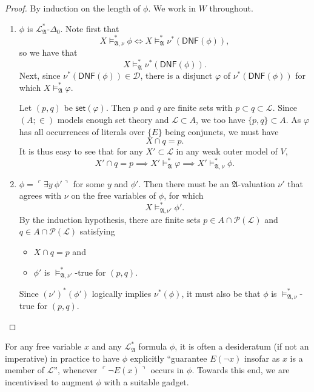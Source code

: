 \documentclass[12pt]{article}
\numberwithin{equation}{section}
\begin{document}
\begin{proof}
By induction on the length of $\phi$. We work in $W$ throughout.
\begin{enumerate}[label=Case \arabic*:, leftmargin=50pt]
    \item $\phi$ is $\mathcal{L}^{*}_{\mathfrak{A}}$-$\Delta_0$. Note first that $$X \models^*_{\mathfrak{A}, \nu} \phi \iff X \models^*_{\mathfrak{A}} \nu^*(\mathsf{DNF}(\phi)),$$ so we have that $$X \models^*_{\mathfrak{A}} \nu^*(\mathsf{DNF}(\phi)).$$ Next, since $\nu^*(\mathsf{DNF}(\phi)) \in \mathcal{D}$, there is a disjunct $\varphi$ of $\nu^*(\mathsf{DNF}(\phi))$ for which $X \models^*_{\mathfrak{A}} \varphi$. 
    
    Let $(p, q)$ be $\mathsf{set}(\varphi)$. Then $p$ and $q$ are finite sets with $p \subset q \subset \mathcal{L}$. Since $(A; \in)$ models enough set theory and $\mathcal{L} \subset A$, we too have $\{p, q\} \subset A$. As $\varphi$ has all occurrences of literals over $\{E\}$ being conjuncts, we must have $$X \cap q = p.$$ It is thus easy to see that for any $X' \subset \mathcal{L}$ in any weak outer model of $V$, $$X' \cap q = p \implies X' \models^*_{\mathfrak{A}} \varphi \implies X' \models^*_{\mathfrak{A}, \nu} \phi.$$
    \item $\phi = \ulcorner \exists y \ \phi' \urcorner$ for some $y$ and $\phi'$. Then there must be an $\mathfrak{A}$-valuation $\nu'$ that agrees with $\nu$ on the free variables of $\phi$, for which $$X \models^{*}_{\mathfrak{A}, \nu'} \phi'.$$ By the induction hypothesis, there are finite sets $p \in A \cap \mathcal{P}(\mathcal{L})$ and $q \in A \cap \mathcal{P}(\mathcal{L})$ satisfying 
    \begin{itemize}
        \item $X \cap q = p$ and
        \item $\phi'$ is $\models^*_{\mathfrak{A}, \nu'}$-true for $(p, q)$. 
    \end{itemize}
    Since $(\nu')^*(\phi')$ logically implies $\nu^*(\phi)$, it must also be that $\phi$ is $\models^{*}_{\mathfrak{A}, \nu}$-true for $(p, q)$. \qedhere
\end{enumerate}
\end{proof}

For any free variable $x$ and any $\mathcal{L}^{*}_{\mathfrak{A}}$ formula $\phi$, it is often a desideratum (if not an imperative) in practice to have $\phi$ explicitly ``guarantee $E(\neg x)$ insofar as $x$ is a member of $\mathcal{L}$'', whenever $\ulcorner \neg E(x) \urcorner$ occurs in $\phi$. Towards this end, we are incentivised to augment $\phi$ with a suitable gadget.
\end{document}

